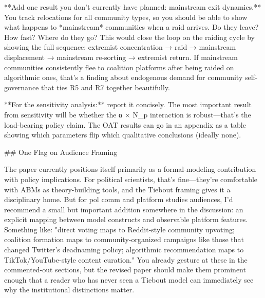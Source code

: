 **Add one result you don't currently have planned: mainstream exit dynamics.** You track relocations for all community types, so you should be able to show what happens to *mainstream* communities when a raid arrives. Do they leave? How fast? Where do they go? This would close the loop on the raiding cycle by showing the full sequence: extremist concentration → raid → mainstream displacement → mainstream re-sorting → extremist return. If mainstream communities consistently flee to coalition platforms after being raided on algorithmic ones, that's a finding about endogenous demand for community self-governance that ties R5 and R7 together beautifully.

**For the sensitivity analysis:** report it concisely. The most important result from sensitivity will be whether the α × N_p interaction is robust—that's the load-bearing policy claim. The OAT results can go in an appendix as a table showing which parameters flip which qualitative conclusions (ideally none).

## One Flag on Audience Framing

The paper currently positions itself primarily as a formal-modeling contribution with policy implications. For political scientists, that's fine—they're comfortable with ABMs as theory-building tools, and the Tiebout framing gives it a disciplinary home. But for pol comm and platform studies audiences, I'd recommend a small but important addition somewhere in the discussion: an explicit mapping between model constructs and observable platform features. Something like: "direct voting maps to Reddit-style community upvoting; coalition formation maps to community-organized campaigns like those that changed Twitter's deadnaming policy; algorithmic recommendation maps to TikTok/YouTube-style content curation." You already gesture at these in the commented-out sections, but the revised paper should make them prominent enough that a reader who has never seen a Tiebout model can immediately see why the institutional distinctions matter.